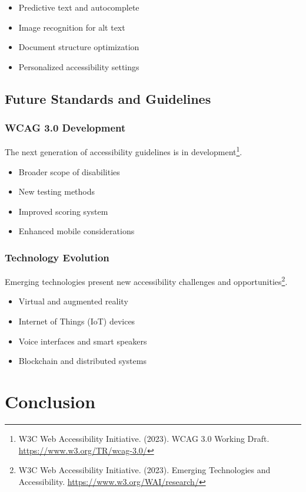 \begin{itemize}
\item Predictive text and autocomplete
\item Image recognition for alt text
\item Document structure optimization
\item Personalized accessibility settings
\end{itemize}

\subsection{Future Standards and Guidelines}

\subsubsection{WCAG 3.0 Development}
The next generation of accessibility guidelines is in development\footnote{W3C Web Accessibility Initiative. (2023). WCAG 3.0 Working Draft. \url{https://www.w3.org/TR/wcag-3.0/}}.

\begin{itemize}
\item Broader scope of disabilities
\item New testing methods
\item Improved scoring system
\item Enhanced mobile considerations
\end{itemize}

\subsubsection{Technology Evolution}
Emerging technologies present new accessibility challenges and opportunities\footnote{W3C Web Accessibility Initiative. (2023). Emerging Technologies and Accessibility. \url{https://www.w3.org/WAI/research/}}.

\begin{itemize}
\item Virtual and augmented reality
\item Internet of Things (IoT) devices
\item Voice interfaces and smart speakers
\item Blockchain and distributed systems
\end{itemize}

\section{Conclusion}
\label{sec:conclusion-office}

